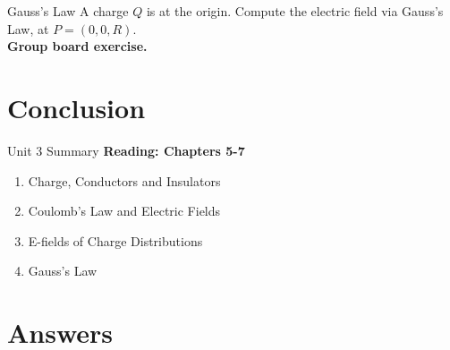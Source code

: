 \documentclass{beamer}
\begin{document}
\begin{frame}{Gauss's Law}
A charge $Q$ is at the origin.  Compute the electric field via Gauss's Law, at $P = (0,0,R)$. \\ \vspace{0.5cm}
\textbf{Group board exercise.}
\end{frame}

\section{Conclusion}

\begin{frame}{Unit 3 Summary}
\textbf{Reading: Chapters 5-7}
\begin{enumerate}
\item Charge, Conductors and Insulators
\item Coulomb's Law and Electric Fields
\item E-fields of Charge Distributions
\item Gauss's Law
\end{enumerate}
\end{frame}

\section{Answers}
\end{document}
